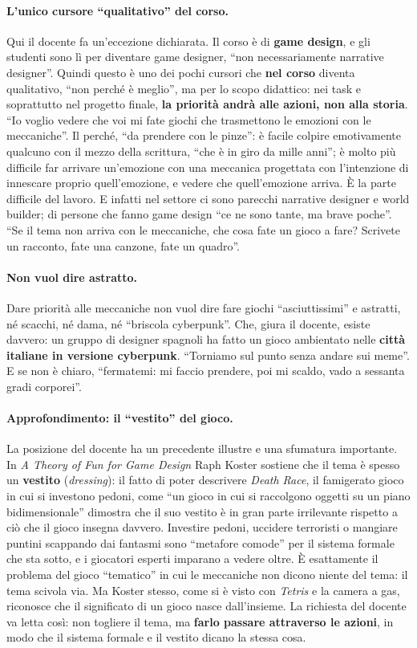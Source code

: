 \paragraph{L'unico cursore ``qualitativo'' del corso.} Qui il docente fa
un'eccezione dichiarata. Il corso è di \textbf{game design}, e gli studenti sono
lì per diventare game designer, ``non necessariamente narrative designer''.
Quindi questo è uno dei pochi cursori che \textbf{nel corso} diventa
qualitativo, ``non perché è meglio'', ma per lo scopo didattico: nei task e
soprattutto nel progetto finale, \textbf{la priorità andrà alle azioni, non alla
storia}. ``Io voglio vedere che voi mi fate giochi che trasmettono le emozioni
con le meccaniche''. Il perché, ``da prendere con le pinze'': è facile colpire
emotivamente qualcuno con il mezzo della scrittura, ``che è in giro da mille
anni''; è molto più difficile far arrivare un'emozione con una meccanica
progettata con l'intenzione di innescare proprio quell'emozione, e vedere che
quell'emozione arriva. È la parte difficile del lavoro. E infatti nel settore ci
sono parecchi narrative designer e world builder; di persone che fanno game
design ``ce ne sono tante, ma brave poche''. ``Se il tema non arriva con le
meccaniche, che cosa fate un gioco a fare? Scrivete un racconto, fate una
canzone, fate un quadro''.

\paragraph{Non vuol dire astratto.} Dare priorità alle meccaniche non vuol dire
fare giochi ``asciuttissimi'' e astratti, né scacchi, né dama, né ``briscola
cyberpunk''. Che, giura il docente, esiste davvero: un gruppo di designer
spagnoli ha fatto un gioco ambientato nelle \textbf{città italiane in versione
cyberpunk}. ``Torniamo sul punto senza andare sui meme''. E se non è chiaro,
``fermatemi: mi faccio prendere, poi mi scaldo, vado a sessanta gradi
corporei''.

\paragraph{Approfondimento: il ``vestito'' del gioco.} La posizione del docente
ha un precedente illustre e una sfumatura importante. In \emph{A Theory of Fun
for Game Design} Raph Koster sostiene che il tema è spesso un \textbf{vestito}
(\emph{dressing}): il fatto di poter descrivere \emph{Death Race}, il famigerato
gioco in cui si investono pedoni, come ``un gioco in cui si raccolgono oggetti su
un piano bidimensionale'' dimostra che il suo vestito è in gran parte irrilevante
rispetto a ciò che il gioco insegna davvero. Investire pedoni, uccidere
terroristi o mangiare puntini scappando dai fantasmi sono ``metafore comode'' per
il sistema formale che sta sotto, e i giocatori esperti imparano a vedere oltre.
È esattamente il problema del gioco ``tematico'' in cui le meccaniche non dicono
niente del tema: il tema scivola via. Ma Koster stesso, come si è visto con
\emph{Tetris} e la camera a gas, riconosce che il significato di un gioco nasce
dall'insieme. La richiesta del docente va letta così: non togliere il tema, ma
\textbf{farlo passare attraverso le azioni}, in modo che il sistema formale e
il vestito dicano la stessa cosa.

